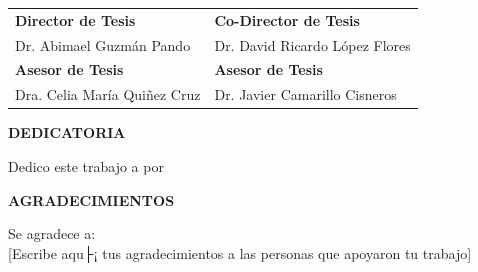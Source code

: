 \documentclass[12pt,letterpaper,oneside]{report}
\begin{document}
\begin{center}
\begin{tabular}{@{}p{6.5cm}p{6.5cm}@{}}
\rule{0pt}{10pt}\textbf{Director de Tesis} & \textbf{Co-Director de Tesis}\\[0.3cm]

Dr. Abimael Guzm\'an Pando & Dr. David Ricardo L\'opez Flores\\[0.8cm]

\textbf{Asesor de Tesis} & \textbf{Asesor de Tesis}\\[0.3cm]

Dra. Celia Mar\'ia Qui\~nez Cruz & Dr. Javier Camarillo Cisneros\\[0.3cm]
\end{tabular}
\end{center}

\newpage
\thispagestyle{empty}

\begin{center}
{\fontsize{14}{16}\selectfont\bfseries DEDICATORIA}\\[1.5cm]
\end{center}

\begin{flushleft}
{\fontsize{12}{14}\selectfont 

Dedico este trabajo a \underline{\hspace{3cm}} por \underline{\hspace{3cm}}\\[2cm]

}
\end{flushleft}

\begin{center}
{\fontsize{14}{16}\selectfont\bfseries AGRADECIMIENTOS}\\[1.5cm]
\end{center}

\begin{flushleft}
{\fontsize{12}{14}\selectfont 

Se agradece a:\\[0.5cm]

[Escribe aqu├¡ tus agradecimientos a las personas que apoyaron tu trabajo]

}
\end{flushleft}

\clearpage  %
\end{document}
